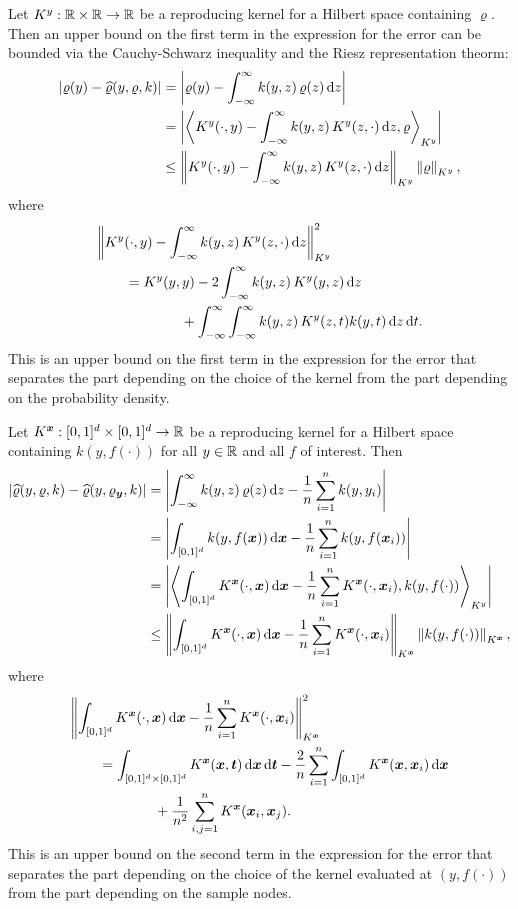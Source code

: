 \documentclass{amsart}
\newcommand{\hvarrho}{\widehat{\varrho}}
\newcommand{\KY}{K^y}
\newcommand{\KX}{K^{\vx}}
\begin{document}
Let $\KY:\reals \times \reals \to \reals$ be a reproducing kernel for a Hilbert space containing $\varrho$.  Then an upper bound on the first term in the expression for the error can be bounded via the Cauchy-Schwarz inequality and the Riesz representation theorm:
\begin{align*}
\abs{\varrho(y) - \hvarrho(y,\varrho,k)} 
& = \abs{\varrho(y) - \int_{-\infty}^{\infty} k(y,z) \, \varrho(z) \, \dif z} \\
& = \abs{\ip[\KY]{\KY(\cdot,y) - \int_{-\infty}^{\infty} k(y,z) \, \KY(z,\cdot) \,  \dif z}{\varrho} } \\
& \le  \norm[\KY]{\KY(\cdot,y) - \int_{-\infty}^{\infty} k(y,z) \, \KY(z,\cdot) \, \dif z} \norm[\KY]{\varrho}, 
\end{align*}
where
\begin{align*}
\MoveEqLeft{\norm[\KY]{\KY(\cdot,y) - \int_{-\infty}^{\infty} k(y,z) \, \KY(z,\cdot) \, \dif z}^2} \\
&=  \KY(y,y) - 2 \int_{-\infty}^{\infty} k(y,z) \, \KY(y,z) \, \dif z \\
& \qquad \qquad + \int_{-\infty}^{\infty} \int_{-\infty}^{\infty}  k(y,z) \, \KY(z,t) k(y,t)\, \dif z \, \dif t.
\end{align*}
This is an upper bound on the first term in the expression for the error that separates the part depending on the choice of the kernel from the part depending on the probability density.

Let $\KX: [0,1]^d \times [0,1]^d\to \reals$ be a reproducing kernel for a Hilbert space containing $k(y,f(\cdot))$ for all $y \in \mathbb{R}$ and all $f$ of interest. Then
\begin{align*}
\abs{\hvarrho(y,\varrho,k) - \hvarrho(y,\varrho_{\vy},k)} 
& = \abs{\int_{-\infty}^{\infty} k(y,z) \, \varrho(z) \, \dif z - 
\frac 1n \sum_{i=1}^n k(y,y_i)} \\
& = \abs{\int_{[0,1]^d} k(y,f(\vx)) \, \dif \vx - 
\frac 1n \sum_{i=1}^n k(y,f(\vx_i))} \\
& = \abs{\ip[\KY]{\int_{[0,1]^d} \KX(\cdot,\vx) \, \dif \vx - 
\frac 1n \sum_{i=1}^n \KX(\cdot,\vx_i)}{k(y,f(\cdot)) }} \\
& \le  \norm[\KX]{\int_{[0,1]^d} \KX(\cdot,\vx) \, \dif \vx - 
\frac 1n \sum_{i=1}^n \KX(\cdot,\vx_i)} \norm[\KX]{k(y,f(\cdot)) } ,
\end{align*}
where
\begin{align*}
\MoveEqLeft{\norm[\KX]{\int_{[0,1]^d} \KX(\cdot,\vx) \, \dif \vx - 
\frac 1n \sum_{i=1}^n \KX(\cdot,\vx_i)}^2} \\
&=  \int_{[0,1]^d \times [0,1]^d} \KX(\vx,\vt) \, \dif \vx \, \dif \vt - 
\frac 2n \sum_{i=1}^n \int_{[0,1]^d} \KX(\vx,\vx_i) \, \dif \vx \\
& \qquad \qquad + \frac 1{n^2} \sum_{i,j=1}^n  \KX(\vx_i,\vx_j) .
\end{align*}
This is an upper bound on the second term in the expression for the error that separates the part depending on the choice of the kernel evaluated at $(y,f(\cdot))$ from the part depending on the sample nodes.
\end{document}
